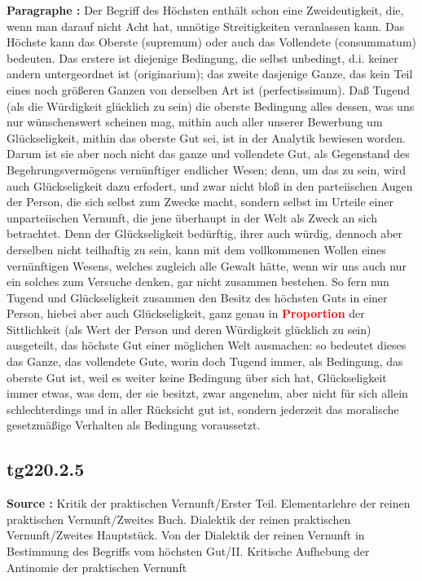 \documentclass[a4paper,12pt,twoside]{book}
\newcommand{\match}[1]{\textcolor{red}{\textbf{#1}}}
\begin{document}
	\noindent\textbf{Paragraphe : }Der Begriff des Höchsten enthält schon eine Zweideutigkeit, die, wenn man darauf nicht Acht hat, unnötige Streitigkeiten veranlassen kann. Das Höchste kann das Oberste (supremum) oder auch das Vollendete (consummatum) bedeuten. Das erstere ist diejenige Bedingung, die selbst unbedingt, d.i. keiner andern untergeordnet ist (originarium); das zweite dasjenige Ganze, das kein Teil eines noch größeren Ganzen von derselben Art ist (perfectissimum). Daß Tugend (als die Würdigkeit glücklich zu sein) die oberste Bedingung alles dessen, was uns nur wünschenswert scheinen mag, mithin auch aller unserer Bewerbung um Glückseligkeit, mithin das oberste Gut sei, ist in der Analytik bewiesen worden. Darum ist sie aber noch nicht das ganze und vollendete Gut, als Gegenstand des Begehrungsvermögens vernünftiger endlicher Wesen; denn, um das zu sein, wird auch Glückseligkeit dazu erfodert, und zwar nicht bloß in den parteiischen Augen der Person, die sich selbst zum Zwecke macht, sondern selbst im Urteile einer unparteiischen Vernunft, die jene überhaupt in der Welt als Zweck an sich betrachtet. Denn der Glückseligkeit bedürftig, ihrer auch würdig, dennoch aber derselben nicht teilhaftig zu sein, kann mit dem vollkommenen Wollen eines vernünftigen Wesens, welches zugleich alle Gewalt hätte, wenn wir uns auch nur ein solches zum Versuche denken, gar nicht zusammen bestehen. So fern nun Tugend  und Glückseligkeit zusammen den Besitz des höchsten Guts in einer Person, hiebei aber auch Glückseligkeit, ganz genau in \match{Proportion} der Sittlichkeit (als Wert der Person und deren Würdigkeit glücklich zu sein) ausgeteilt, das höchste Gut einer möglichen Welt ausmachen: so bedeutet dieses das Ganze, das vollendete Gute, worin doch Tugend immer, als Bedingung, das oberste Gut ist, weil es weiter keine Bedingung über sich hat, Glückseligkeit immer etwas, was dem, der sie besitzt, zwar angenehm, aber nicht für sich allein schlechterdings und in aller Rücksicht gut ist, sondern jederzeit das moralische gesetzmäßige Verhalten als Bedingung voraussetzt. 
	
	\subsection*{tg220.2.5} 
	\textbf{Source : }Kritik der praktischen Vernunft/Erster Teil. Elementarlehre der reinen praktischen Vernunft/Zweites Buch. Dialektik der reinen praktischen Vernunft/Zweites Hauptstück. Von der Dialektik der reinen Vernunft in Bestimmung des Begriffs vom höchsten Gut/II. Kritische Aufhebung der Antinomie der praktischen Vernunft\\  
	
\end{document}
